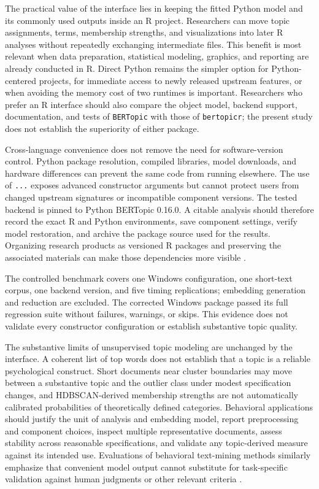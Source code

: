 \documentclass[12pt]{article}
\newcommand{\pkg}[1]{\texttt{#1}}
\newcommand{\code}[1]{\texttt{#1}}
\begin{document}
The practical value of the interface lies in keeping the fitted Python model and its commonly used outputs inside an R project. Researchers can move topic assignments, terms, membership strengths, and visualizations into later R analyses without repeatedly exchanging intermediate files. This benefit is most relevant when data preparation, statistical modeling, graphics, and reporting are already conducted in R. Direct Python remains the simpler option for Python-centered projects, for immediate access to newly released upstream features, or when avoiding the memory cost of two runtimes is important. Researchers who prefer an R interface should also compare the object model, backend support, documentation, and tests of \pkg{BERTopic} with those of \pkg{bertopicr}; the present study does not establish the superiority of either package.

Cross-language convenience does not remove the need for software-version control. Python package resolution, compiled libraries, model downloads, and hardware differences can prevent the same code from running elsewhere. The use of \code{...} exposes advanced constructor arguments but cannot protect users from changed upstream signatures or incompatible component versions. The tested backend is pinned to Python BERTopic 0.16.0. A citable analysis should therefore record the exact R and Python environments, save component settings, verify model restoration, and archive the package source used for the results. Organizing research products as versioned R packages and preserving the associated materials can make those dependencies more visible \citep{vuorre2021sharing}.

The controlled benchmark covers one Windows configuration, one short-text corpus, one backend version, and five timing replications; embedding generation and reduction are excluded. The corrected Windows package passed its full regression suite without failures, warnings, or skips. This evidence does not validate every constructor configuration or establish substantive topic quality.

The substantive limits of unsupervised topic modeling are unchanged by the interface. A coherent list of top words does not establish that a topic is a reliable psychological construct. Short documents near cluster boundaries may move between a substantive topic and the outlier class under modest specification changes, and HDBSCAN-derived membership strengths are not automatically calibrated probabilities of theoretically defined categories. Behavioral applications should justify the unit of analysis and embedding model, report preprocessing and component choices, inspect multiple representative documents, assess stability across reasonable specifications, and validate any topic-derived measure against its intended use. Evaluations of behavioral text-mining methods similarly emphasize that convenient model output cannot substitute for task-specific validation against human judgments or other relevant criteria \citep{macanovic2024systematic}.
\end{document}
